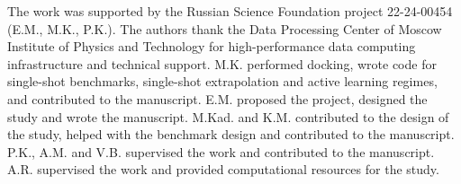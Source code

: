 \begin{acknowledgement}

The work was supported by the Russian Science Foundation project 22-24-00454 (E.M., M.K., P.K.). The authors thank the Data Processing Center of Moscow Institute of Physics and Technology for high-performance data computing infrastructure and technical support.
M.K. performed docking, wrote code for single-shot benchmarks, single-shot extrapolation and active learning regimes, and contributed to the manuscript.
E.M. proposed the project, designed the study and wrote the manuscript.
M.Kad. and K.M. contributed to the design of the study, helped with the benchmark design and contributed to the manuscript.
P.K., A.M. and V.B. supervised the work and contributed to the manuscript.
A.R. supervised the work and provided computational resources for the study.

\end{acknowledgement}